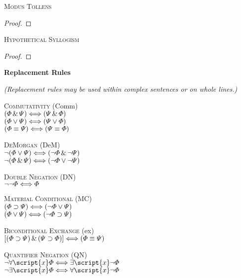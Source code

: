 \textsc{Modus Tollens}

\begin{proof}
	 
\end{proof}

\textsc{Hypothetical Syllogism}

\begin{proof}
\end{proof}



{\large \bf Replacement Rules}

\begin{footnotesize}\emph{(Replacement rules may be used within complex sentences or on whole lines.)}\end{footnotesize}

\textsc{Commutativity} (Comm)\\
$(\varPhi{}\,\&\,\varPsi{}) \Longleftrightarrow (\varPsi{}\,\&\,\varPhi{})$\\
$(\varPhi{}\vee\varPsi{}) \Longleftrightarrow (\varPsi{}\vee\varPhi{})$\\
$(\varPhi{}\equiv\varPsi{}) \Longleftrightarrow (\varPsi{}\equiv\varPhi{})$

\textsc{DeMorgan} (DeM)\\
$\neg(\varPhi{}\vee\varPsi{}) \Longleftrightarrow (\neg\varPhi{}\,\&\,\neg\varPsi{})$\\
$\neg(\varPhi{}\,\&\,\varPsi{}) \Longleftrightarrow (\neg\varPhi{}\vee\neg\varPsi{})$

\textsc{Double Negation} (DN)\\
$\neg\neg\varPhi{} \Longleftrightarrow \varPhi{}$

\textsc{Material Conditional} (MC)\\
$(\varPhi{}\supset\varPsi{}) \Longleftrightarrow (\neg\varPhi{}\vee\varPsi{})$\\
$(\varPhi{}\vee\varPsi{}) \Longleftrightarrow (\neg\varPhi{}\supset\varPsi{})$

\textsc{Biconditional Exchange} ({\eiff}{ex})\\
$[(\varPhi{}\supset\varPsi{})\,\&\,(\varPsi{}\supset\varPhi{})] \Longleftrightarrow (\varPhi{}\equiv\varPsi{})$

\textsc{Quantifier Negation} (QN)\\
$\enot\forall\script{x}\metaA{} \Longleftrightarrow \exists\script{x}\enot\metaA{}$\\
$\enot\exists\script{x}\metaA{} \Longleftrightarrow \forall\script{x}\enot\metaA{}$
